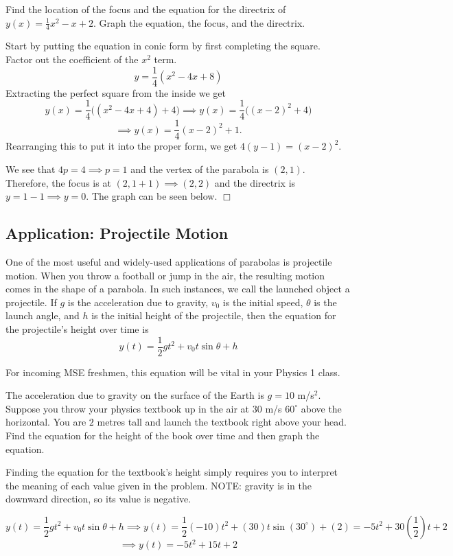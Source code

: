 \documentclass[lang=en,11pt]{elegantbook}
\begin{document}
\begin{example}
Find the location of the focus and the equation for the directrix of $y(x) = \frac{1}{4}x^2-x+2$.  Graph the equation, the focus, and the directrix.
\end{example}
\begin{solution}
Start by putting the equation in conic form by first completing the square. \\
Factor out the coefficient of the $x^2$ term.
$$ y = \frac{1}{4}(x^2-4x+8) $$
Extracting the perfect square from the inside we get $$y(x)=\dfrac{1}{4}\big((x^2-4x+4)+4\big) \implies y(x)=\dfrac{1}{4}\big((x-2)^2+4\big)$$$$\implies y(x)=\dfrac{1}{4}(x-2)^2+1.$$
Rearranging this to put it into the proper form, we get $4(y-1) = (x-2)^2$.

We see that $4p = 4 \implies p = 1$ and the vertex of the parabola is $(2,1)$.  Therefore, the focus is at $(2,1+1)\implies(2,2)$ and the directrix is $y = 1-1 \implies y=0$.  The graph can be seen below. $\Box$
\end{solution}

\subsection{Application: Projectile Motion}
\noindent One of the most useful and widely-used applications of parabolas is projectile motion.  When you throw a football or jump in the air, the resulting motion comes in the shape of a parabola.  In such instances, we call the launched object a projectile.  If $g$ is the acceleration due to gravity, $v_0$ is the initial speed, $\theta$ is the launch angle, and $h$ is the initial height of the projectile, then the equation for the projectile's height over time is
$$y(t)=\frac{1}{2}gt^2+v_0t\sin{\theta}+h$$

\begin{remark}
For incoming MSE freshmen, this equation will be vital in your Physics 1 class.
\end{remark}

\begin{example}
The acceleration due to gravity on the surface of the Earth is $g = 10$ m/s$^2$.  Suppose you throw your physics textbook up in the air at $30$ m/s $60^{\circ}$ above the horizontal.  You are $2$ metres tall and launch the textbook right above your head.  Find the equation for the height of the book over time and then graph the equation.
\end{example}
\begin{solution}
Finding the equation for the textbook's height simply requires you to interpret the meaning of each value given in the problem.  NOTE: gravity is in the downward direction, so its value is negative.
\end{solution}
$$ y(t) = \frac{1}{2}gt^2 + v_0t\sin{\theta}+h \implies y(t)=\frac{1}{2}(-10)t^2 + (30)t\sin{(30^\circ)} + (2)= -5t^2 + 30\left(\frac{1}{2}\right)t + 2$$ $$\implies y(t) = -5t^2 + 15t + 2 $$
\end{document}
